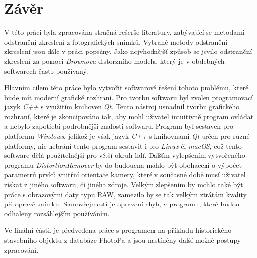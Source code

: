 \chapter{Závěr}
\label{9-zaver}

		V této práci byla zpracována stručná rešerše literatury, zabývající se metodami odstranění zkreslení z fotografických snímků. Vybrané metody odstranění zkreslení jsou dále v práci popsány. Jako nejvhodnější způsob se jevilo odstranění zkreslení za pomoci \textit{Brownova} distorzního modelu, který je v obdobných softwarech často používaný.
	
	Hlavním cílem této práce bylo vytvořit softwarové řešení tohoto problému, které bude mít moderní grafické rozhraní. Pro tvorbu softwaru byl zvolen programovací jazyk \textit{C++} s využitím knihoven \textit{Qt}. Tento nástroj usnadnil tvorbu grafického rozhraní, které je zkoncipováno tak, aby mohl uživatel intuitivně program ovládat a nebylo zapotřebí podrobnější znalosti softwaru. Program byl sestaven pro platformu \textit{Windows}, jelikož je však jazyk \textit{C++} s knihovnami \textit{Qt} určen pro různé platformy, nic nebrání tento program sestavit i pro \textit{Linux} či \textit{macOS}, což tento software dělá použitelnější pro větší okruh lidí. Dalším vylepšením vytvořeného programu \textit{DistortionRemover} by do budoucna mohlo být obohacení o výpočet parametrů prvků vnitřní orientace kamery, které v současné době musí uživatel získat z jiného softwaru, či jiného zdroje. Velkým zlepšením by mohlo také být práce s obrazovými daty typu RAW, zamezilo by se tak velkým ztrátám kvality při opravě snímku. Samozřejmostí je opravení chyb, v programu, které budou odhaleny rozsáhlejším používáním. 
		
	Ve finální části, je předvedena práce s programem na příkladu historického stavebního objektu z databáze PhotoPa a jsou nastíněny další možné postupy zpracování.

	

